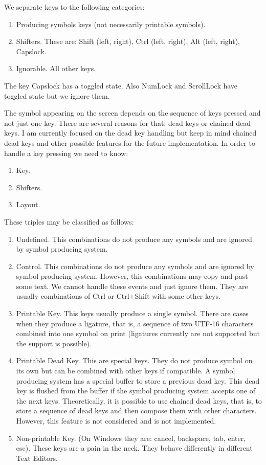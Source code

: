 \documentclass{article}
\begin{document}
We separate keys to the following  categories:
\begin{enumerate}
\item Producing symbols keys (not necessarily printable symbols).
\item Shifters. These are: Shift (left, right), Ctrl (left, right), Alt (left, right), Capslock.
\item Ignorable. All other keys.
\end{enumerate}
The key Capslock has a toggled state. Also NumLock and ScrollLock have toggled state but we ignore them.

The symbol appearing on the screen depends on the sequence of keys pressed and not just one key. There are several reasons for that: dead keys or chained dead keys. I am currently focused on the dead key handling but keep in mind chained dead keys and other possible features for the future implementation. In order to handle a key pressing we need to know:
\begin{enumerate}
\item Key.
\item Shifters.
\item Layout.
\end{enumerate}

These triples may be classified as follows:
\begin{enumerate}
\item Undefined. This combinations do not produce any symbols and are ignored by symbol producing system.
\item Control. This combinations do not produce any symbols and are ignored by symbol producing system. However, this combinations may copy and past some text. We cannot handle these events and just ignore them. They are usually combinations of Ctrl or Ctrl+Shift with some other keys.

\item Printable Key. This keys usually produce a single symbol. There are cases when they produce a ligature, that is, a sequence of two UTF-16 characters combined into one symbol on print (ligatures currently are not supported but the support is possible).
\item Printable Dead Key. This are special keys. They do not produce symbol on its own but can be combined with other keys if compatible. A symbol producing system has a special buffer to store a previous dead key. This dead key is flushed from the buffer if the symbol producing system accepts one of the next keys. Theoretically, it is possible to use chained dead keys, that is, to store a sequence of dead keys and then compose them with other characters. However, this feature is not considered and is not implemented.
\item Non-printable Key. (On Windows they are: cancel, backspace, tab, enter, esc). These keys are a pain in the neck. They behave differently in different Text Editors.
\end{enumerate}
\end{document}

